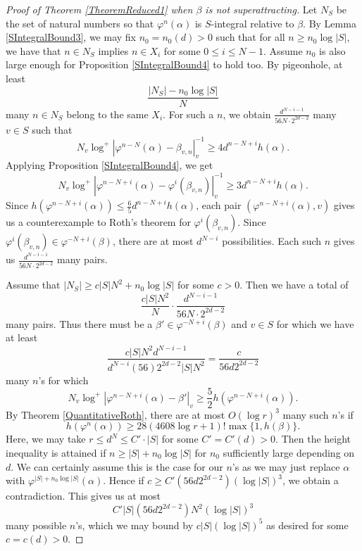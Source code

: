 \documentclass[10pt, reqno]{amsart}
\newcommand{\vphi}{\varphi}
\numberwithin{theorem}{section}
\numberwithin{equation}{section}
\numberwithin{example}{section}
\numberwithin{definition}{section}
\begin{document}
\begin{proof}[Proof of Theorem \ref{TheoremReduced1} when $\beta$ is not superattracting]
Let $N_S$ be the set of natural numbers so that $\vphi^n(\alpha)$ is $S$-integral relative to $\beta$. By Lemma \ref{SIntegralBound3}, we may fix $n_0 = n_0(d) > 0$ such that for all $n \geq n_0 \log |S|$, we have that $n \in N_S$ implies $n \in X_i$ for some $0 \leq i \leq N-1$. Assume $n_0$ is also large enough for Proposition \ref{SIntegralBound4} to hold too. By pigeonhole, at least 
$$\frac{|N_S|- n_0\log |S|}{N}$$
many $n \in N_S$ belong to the same $X_i$. For such a $n$, we obtain $\frac{d^{N-i-1}}{56 N \cdot 2^{2d-2}}$ many $v \in S$ such that 
$$N_v \log^+|\vphi^{n-N}(\alpha) - \beta_{v,n}|_v^{-1} \geq 4d^{n-N+i}h(\alpha).$$
Applying Proposition \ref{SIntegralBound4}, we get
$$N_v \log^+|\vphi^{n-N+i}(\alpha) - \vphi^i(\beta_{v,n})|^{-1}_v \geq 3d^{n-N+i}h(\alpha).$$
Since $h(\vphi^{n-N+i}(\alpha)) \leq \frac{6}{5} d^{n-N+i}h(\alpha)$, each pair $(\vphi^{n-N+i}(\alpha), v)$ gives us a counterexample to Roth's theorem for $\vphi^i(\beta_{v,n})$. Since $\vphi^i(\beta_{v,n}) \in \vphi^{-N+i}(\beta)$, there are at most $d^{N-i}$ possibilities. Each such $n$ gives us $\frac{d^{N-i-1}}{56 N \cdot 2^{2d-2}}$ many pairs. 
\par 
Assume that $|N_S| \geq c |S| N^2 + n_0 \log |S|$ for some $c > 0$. Then we have a total of 
$$\frac{c |S| N^2}{N} \cdot \frac{d^{N-i-1}}{56 N \cdot 2^{2d-2}}$$
many pairs. Thus there must be a $\beta' \in \vphi^{-N+i}(\beta)$ and $v \in S$ for which we have at least 
$$\frac{c |S| N^2 d^{N-i-1}}{d^{N-i} (56) 2^{2d-2} |S| N^2} = \frac{c}{56 d 2^{2d-2}}$$
many $n$'s for which 
$$N_v \log^+|\vphi^{n-N+i}(\alpha) - \beta'|_v \geq \frac{5}{2} h(\vphi^{n-N+i}(\alpha)).$$
By Theorem \ref{QuantitativeRoth}, there are at most $O(\log r)^3$ many such $n$'s if 
$$h(\vphi^n(\alpha)) \geq 28(4608 \log r+1)! \max\{1,h(\beta)\}.$$
 Here, we may take $r \leq d^N \leq C' \cdot |S|$ for some $C' = C'(d) > 0$. Then the height inequality is attained if $n \geq |S| + n_0 \log |S|$ for $n_0$ sufficiently large depending on $d$. We can certainly assume this is the case for our $n$'s as we may just replace $\alpha$ with $\vphi^{|S| + n_0 \log |S|}(\alpha)$. 
 Hence if $c \geq C' (56 d 2^{2d-2}) (\log |S|)^3$, we obtain a contradiction. This gives us at most 
$$C' |S| (56 d 2^{2d-2})N^2 (\log |S|)^3$$
many possible $n$'s, which we may bound by $c|S| (\log |S|)^5$ as desired for some $c = c(d) > 0$.
\end{proof}
\end{document}
